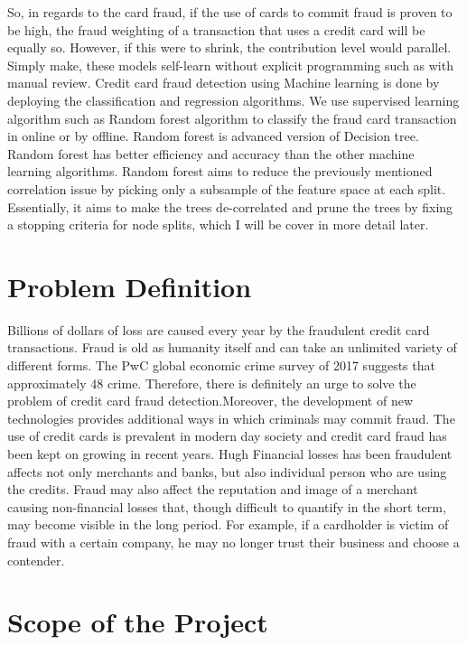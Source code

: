 So, in regards to the card fraud, if the use of cards to
commit fraud is proven to be high, the fraud weighting of a
transaction that uses a credit card will be equally so.
However, if this were to shrink, the contribution level would
parallel. Simply make, these models self-learn without
explicit programming such as with manual review. Credit
card fraud detection using Machine learning is done by
deploying the classification and regression algorithms. We
use supervised learning algorithm such as Random forest
algorithm to classify the fraud card transaction in online or
by offline. Random forest is advanced version of Decision
tree. Random forest has better efficiency and accuracy than
the other machine learning algorithms. Random forest aims
to reduce the previously mentioned correlation issue by
picking only a subsample of the feature space at each
split. Essentially, it aims to make the trees de-correlated
and prune the trees by fixing a stopping criteria for node
splits, which I will be cover in more detail later.

\section{Problem Definition}

Billions of dollars of loss are caused every year by the
fraudulent credit card transactions. Fraud is old as humanity
itself and can take an unlimited variety of different forms.
The PwC global economic crime survey of 2017 suggests that
approximately 48%
crime. Therefore, there is definitely an urge to solve the
problem of credit card fraud detection.Moreover, the
development of new technologies provides additional ways
in which criminals may commit fraud. The use of credit cards
is prevalent in modern day society and credit card fraud has
been kept on growing in recent years. Hugh Financial losses
has been fraudulent affects not only merchants and banks,
but also individual person who are using the credits. Fraud
may also affect the reputation and image of a merchant
causing non-financial losses that, though difficult to quantify
in the short term, may become visible in the long period. For
example, if a cardholder is victim of fraud with a certain
company, he may no longer trust their business and choose a
contender.

\section{Scope of the Project}


